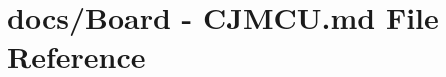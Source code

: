 \hypertarget{Board_01-_01CJMCU_8md}{\section{docs/\+Board -\/ C\+J\+M\+C\+U.\+md File Reference}
\label{Board_01-_01CJMCU_8md}
}
